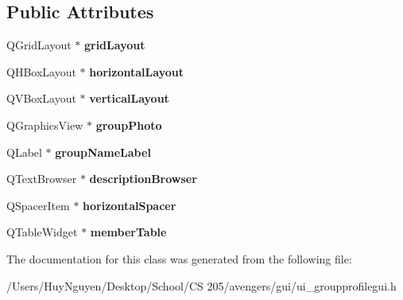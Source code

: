 \subsection*{Public Attributes}
\begin{DoxyCompactItemize}
\item 
Q\+Grid\+Layout $\ast$ {\bfseries grid\+Layout}\hypertarget{classUi__GroupProfileGUI_a947986d75851417aeaa1fd0bbcb78c5a}{}\label{classUi__GroupProfileGUI_a947986d75851417aeaa1fd0bbcb78c5a}

\item 
Q\+H\+Box\+Layout $\ast$ {\bfseries horizontal\+Layout}\hypertarget{classUi__GroupProfileGUI_a8ecd1ba8dd6f652bb2274b14a18de9d3}{}\label{classUi__GroupProfileGUI_a8ecd1ba8dd6f652bb2274b14a18de9d3}

\item 
Q\+V\+Box\+Layout $\ast$ {\bfseries vertical\+Layout}\hypertarget{classUi__GroupProfileGUI_ae7b8a78504396db807f933332bda64bc}{}\label{classUi__GroupProfileGUI_ae7b8a78504396db807f933332bda64bc}

\item 
Q\+Graphics\+View $\ast$ {\bfseries group\+Photo}\hypertarget{classUi__GroupProfileGUI_a768b6375b765d07ff3e3a7459faf61f8}{}\label{classUi__GroupProfileGUI_a768b6375b765d07ff3e3a7459faf61f8}

\item 
Q\+Label $\ast$ {\bfseries group\+Name\+Label}\hypertarget{classUi__GroupProfileGUI_a8ea9d678070777782582113f842959ff}{}\label{classUi__GroupProfileGUI_a8ea9d678070777782582113f842959ff}

\item 
Q\+Text\+Browser $\ast$ {\bfseries description\+Browser}\hypertarget{classUi__GroupProfileGUI_a03e4452686554bd32eda9f7bef717923}{}\label{classUi__GroupProfileGUI_a03e4452686554bd32eda9f7bef717923}

\item 
Q\+Spacer\+Item $\ast$ {\bfseries horizontal\+Spacer}\hypertarget{classUi__GroupProfileGUI_ab7ecc90497133adc3cb0ad1147a221d1}{}\label{classUi__GroupProfileGUI_ab7ecc90497133adc3cb0ad1147a221d1}

\item 
Q\+Table\+Widget $\ast$ {\bfseries member\+Table}\hypertarget{classUi__GroupProfileGUI_a7e5466a05be84d905ebfd3d3ebd7de8b}{}\label{classUi__GroupProfileGUI_a7e5466a05be84d905ebfd3d3ebd7de8b}

\end{DoxyCompactItemize}


The documentation for this class was generated from the following file\+:\begin{DoxyCompactItemize}
\item 
/\+Users/\+Huy\+Nguyen/\+Desktop/\+School/\+C\+S 205/avengers/gui/ui\+\_\+groupprofilegui.\+h\end{DoxyCompactItemize}
